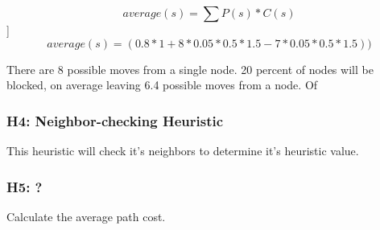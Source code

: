 \[average(s) = \sum{P(s)*C(s)}  \]]
\[average(s) = (0.8 * 1 + 8*0.05*0.5*1.5 - 7*0.05*0.5*1.5  )) \]

There are 8 possible moves from a single node. 20 percent of nodes will be blocked, on average leaving 6.4 possible moves from a node. Of

\subsubsection{H4: Neighbor-checking Heuristic}
This heuristic will check it's neighbors to determine it's heuristic value.

\subsubsection{H5: ?}


Calculate the average path cost.